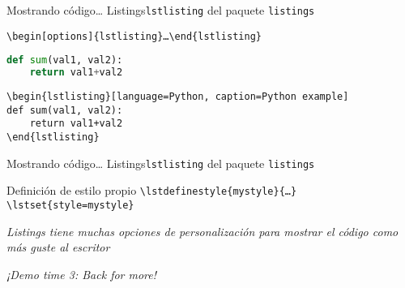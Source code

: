 

\begin{frame}[fragile]{Mostrando código\ldots{} Listings}{\texttt{lstlisting} del paquete \texttt{listings}}
    \begin{block}{}
    \texttt{\textbackslash begin[options]\{lstlisting\}\ldots{}\textbackslash end\{lstlisting\}}
    \end{block}

    \begin{lstlisting}[language=Python, caption=Python example]
def sum(val1, val2):
    return val1+val2
    \end{lstlisting}

{\small
    \begin{verbatim}
\begin{lstlisting}[language=Python, caption=Python example]
def sum(val1, val2):
    return val1+val2
\end{lstlisting}
    \end{verbatim}
}

\end{frame}


\begin{frame}{Mostrando código\ldots{} Listings}{\texttt{lstlisting} del paquete \texttt{listings}}
    \begin{block}{Definición de estilo propio}
        \texttt{\textbackslash lstdefinestyle\{mystyle\}\{\ldots{}\}}
        \texttt{\textbackslash lstset\{style=mystyle\}}
        \vspace{1.5cm}

        \textit{Listings tiene muchas opciones de personalización para mostrar el código como más guste al escritor}
    \end{block}

    \pause

    \centering
    \textit{¡Demo time 3: Back for more!}
\end{frame}